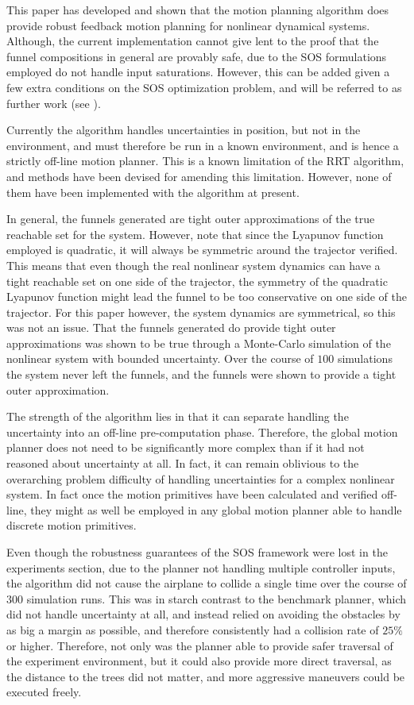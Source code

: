 
This paper has developed and shown that the \rrtfunnel{} motion planning
algorithm does provide robust feedback motion planning for nonlinear dynamical
systems. Although, the current implementation cannot give lent to the proof that
the funnel compositions in general are provably safe, due to the \ac{SOS}
formulations employed do not handle input saturations. However, this can be
added given a few extra conditions on the \ac{SOS} optimization problem, and
will be referred to as further work (see
\cite{majumdarFunnelLibrariesRealtime2017}).


Currently the algorithm handles uncertainties in position, but not in the
environment, and must therefore be run in a known environment, and is hence a
strictly off-line motion planner. This is a known limitation of the \ac{RRT}
algorithm, and methods have been devised for amending this limitation. However,
none of them have been implemented with the \rrtfunnel{} algorithm at present.


In general, the funnels generated are tight outer approximations of the true
reachable set for the system. However, note that since the Lyapunov function
employed is quadratic, it will always be symmetric around the trajector
verified. This means that even though the real nonlinear system dynamics can
have a tight reachable set on one side of the trajector, the symmetry of the
quadratic Lyapunov function might lead the funnel to be too conservative on one
side of the trajector. For this paper however, the system dynamics are
symmetrical, so this was not an issue. That the funnels generated do provide
tight outer approximations was shown to be true through a Monte-Carlo simulation
of the nonlinear system with bounded uncertainty. Over the course of \(100\)
simulations the system never left the funnels, and the funnels were shown to
provide a tight outer approximation.


The strength of the algorithm lies in that it can separate handling the
uncertainty into an off-line pre-computation phase. Therefore, the global motion
planner does not need to be significantly more complex than if it had not
reasoned about uncertainty at all. In fact, it can remain oblivious to the
overarching problem difficulty of handling uncertainties for a complex nonlinear
system. In fact once the motion primitives have been calculated and verified
off-line, they might as well be employed in any global motion planner able to
handle discrete motion primitives.


Even though the robustness guarantees of the \ac{SOS} framework were lost in the
experiments section, due to the planner not handling multiple controller inputs,
the \rrtfunnel{} algorithm did not cause the airplane to collide a single time
over the course of \(300\) simulation runs. This was in starch contrast to the
benchmark planner, which did not handle uncertainty at all, and instead relied
on avoiding the obstacles by as big a margin as possible, and therefore
consistently had a collision rate of \(25\%\) or higher. Therefore, not only was
the \rrtfunnel{} planner able to provide safer traversal of the experiment
environment, but it could also provide more direct traversal, as the distance to
the trees did not matter, and more aggressive maneuvers could be executed
freely.

